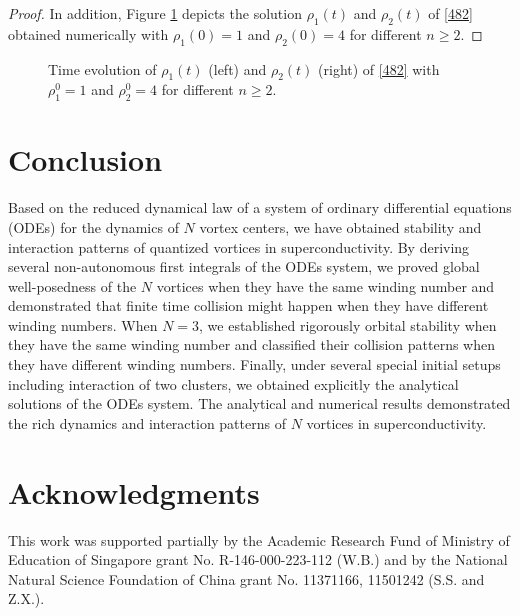 \documentclass{aims}
\theoremstyle{plain}
\theoremstyle{definition}
\begin{document}
\begin{proof}
In addition,
Figure \ref{rho126} depicts the solution
$\rho_1(t)$ and $\rho_2(t)$ of \eqref{482} obtained numerically with $\rho_1(0)=1$ and $\rho_2(0)=4$ for different $n\ge2$.
\end{proof}

\begin{figure}[t!]
\centerline{
}
\caption{Time evolution of $\rho_1(t)$ (left) and $\rho_2(t)$ (right)
of \eqref{482} with $\rho_1^0=1$ and $\rho_2^0=4$ for different $n\ge2$.}
\label{rho126}
\end{figure}











\section{Conclusion}
Based on the reduced dynamical law of a system of ordinary differential
equations (ODEs) for the dynamics of $N$ vortex centers, we
have obtained stability and interaction patterns
of quantized vortices in superconductivity.
By deriving several non-autonomous first integrals of the
ODEs system, we proved  global well-posedness
of the $N$ vortices when they have the same winding number and
demonstrated that finite time collision might happen when they
have different winding numbers.
When $N=3$, we established rigorously
orbital stability when they have the same winding number
and classified their collision patterns when they have different
winding numbers. Finally, under several special initial setups
 including interaction of
two clusters, we obtained explicitly the analytical solutions
of the ODEs system. The analytical and numerical results demonstrated
the rich dynamics and interaction patterns of $N$ vortices in
superconductivity.





\section*{Acknowledgments}
This work was supported partially by the Academic Research
Fund of Ministry of Education of Singapore grant No.
R-146-000-223-112 (W.B.) and
by the National Natural Science Foundation of China grant No. 11371166,  11501242 (S.S. and Z.X.).







\end{document}
